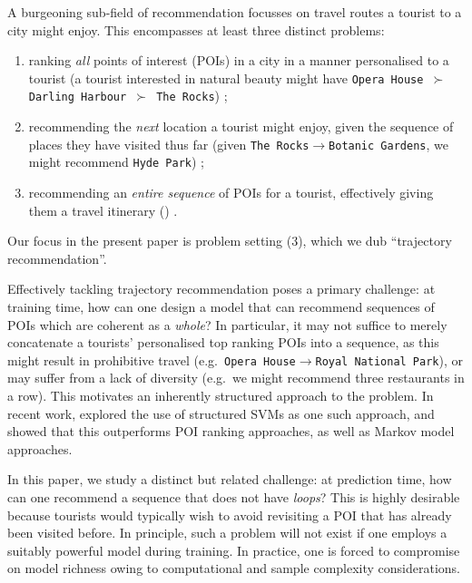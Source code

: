 
A burgeoning sub-field of recommendation focusses on travel routes a tourist to a city might enjoy.
This encompasses at least three distinct problems:
\begin{enumerate}[(1)]
	\item ranking \emph{all} points of interest (POIs) in a city in a manner personalised to a tourist (\eg a tourist interested in natural beauty might have {\tt Opera House $\succ$ Darling Harbour $\succ$ The Rocks}) \citep{shi2011personalized,lian2014geomf,hsieh2014mining,yuan2014graph};
	\item recommending the \emph{next} location a tourist might enjoy, given the sequence of places they have visited thus far (\eg given {\tt The Rocks$\to$Botanic Gardens}, we might recommend {\tt Hyde Park}) \citep{fpmc10,ijcai13,zhang2015location};
	\item recommending an \emph{entire sequence} of POIs for a tourist, effectively giving them a travel itinerary () \citep{lu2010photo2trip,ijcai15,lu2012personalized,gioniswsdm14,chen2015tripplanner}.
\end{enumerate}
Our focus in the present paper is problem setting (3), which we dub ``trajectory recommendation''.

Effectively tackling trajectory recommendation poses a primary challenge:
at training time, how can one design a model that can recommend sequences of POIs which are coherent as a \emph{whole}?
In particular, it may not suffice to merely concatenate a tourists' personalised top ranking POIs into a sequence,
as this might result in prohibitive travel (e.g.\ {\tt Opera House$\to$Royal National Park}),
or may suffer from a lack of diversity (e.g.\ we might recommend three restaurants in a row).
This motivates an inherently structured approach to the problem.
In recent work, \citet{Chen:2017} explored the use of structured SVMs as one such approach, and showed that this outperforms POI ranking approaches, as well as Markov model approaches.

In this paper, we study a distinct but related challenge:
at prediction time, how can one recommend a sequence that does not have \emph{loops}?
This is highly desirable because tourists would typically wish to avoid revisiting a POI that has already been visited before.
In principle, such a problem will not exist if one employs a suitably powerful model during training.
In practice, one is forced to compromise on model richness owing to computational and sample complexity considerations.

